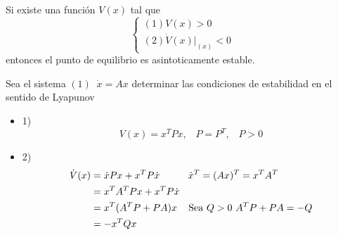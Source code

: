 Si existe una función \( V(x) \) tal que
\[
    \left\{
        \begin{array}{lll}
            (1) V(x) > 0 \\
            (2) \dot{V}(x) \big |_{(x)} < 0
        \end{array}
    \right.
\]
entonces el punto de equilibrio es asintoticamente estable.

Sea el sistema \( (1) \;\; \dot{x} = Ax \) determinar las condiciones de estabilidad en el sentido de Lyapunov
\begin{itemize}
    \item 1) 
    \[
        V(x) = x^{T}Px, \;\;\; P = P^{T}, \;\;\; P > 0
    \]
    
    \item 2) 
    \[
        \begin{split}
            \dot{V}(x) & = \dot{x}Px + x^{T}P\dot{x} \;\;\; \text{ \;\;\; \;\;\(\dot{x}^{T} = (Ax)^{T} = x^{T}A^{T}\) } \\
            & = x^{T}A^{T}Px + x^{T}P\dot{x} \\
            & = x^{T}(A^{T}P + PA)x \;\;\; \text{  Sea \( Q > 0\) \( A^{T}P + PA = -Q\)} \\
            & = -x^{T}Qx
        \end{split}
    \]
\end{itemize}